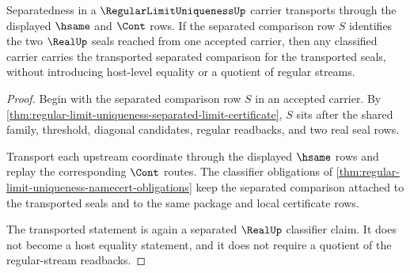 \begin{theorem}
\label{thm:regular-limit-uniqueness-separated-transport}
Separatedness in a $\RegularLimitUniquenessUp$ carrier transports through the displayed $\hsame$ and $\Cont$ rows. If the separated comparison row $S$ identifies the two $\RealUp$ seals reached from one accepted carrier, then any classified carrier carries the transported separated comparison for the transported seals, without introducing host-level equality or a quotient of regular streams.
\end{theorem}
\begin{proof}
Begin with the separated comparison row $S$ in an accepted carrier. By \autoref{thm:regular-limit-uniqueness-separated-limit-certificate}, $S$ sits after the shared family, threshold, diagonal candidates, regular readbacks, and two real seal rows.

Transport each upstream coordinate through the displayed $\hsame$ rows and replay the corresponding $\Cont$ routes. The classifier obligations of \autoref{thm:regular-limit-uniqueness-namecert-obligations} keep the separated comparison attached to the transported seals and to the same package and local certificate rows.

The transported statement is again a separated $\RealUp$ classifier claim. It does not become a host equality statement, and it does not require a quotient of the regular-stream readbacks.
\end{proof}

